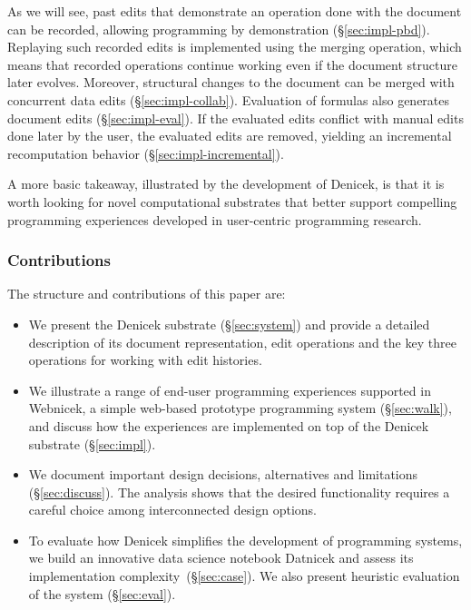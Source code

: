\documentclass[sigconf]{acmart}
\newcommand{\diff}[1]{{#1}}
\newcommand{\note}[1]{}
\begin{document}
As we will see, past edits that demonstrate an operation done with the
document can be recorded, allowing programming by demonstration (\S\ref{sec:impl-pbd}).  Replaying
such recorded edits is implemented using the merging operation, which means that recorded operations
continue working even if the document structure later evolves. Moreover, structural changes to the
document can be merged with concurrent data edits  (\S\ref{sec:impl-collab}). Evaluation of formulas
also generates document edits (\S\ref{sec:impl-eval}). If the evaluated edits conflict with manual
edits done later by the user, the evaluated edits are removed, yielding an incremental
recomputation behavior (\S\ref{sec:impl-incremental}).

\note{Add a more general takeaway suggested by Reviewer 3 (Thank you!)}
\diff{A more basic takeaway, illustrated by the development of Denicek, is that it is worth looking
for novel computational substrates that better support compelling programming experiences developed
in user-centric programming research.}

\subsubsection*{Contributions}
The structure and contributions of this paper are:

\begin{itemize}
\item We present the Denicek substrate (\S\ref{sec:system}) and provide a detailed description of its
  document representation, edit operations and the key three operations for working with edit histories.
\item We illustrate a range of end-user programming experiences supported in Webnicek, a simple
  web-based prototype programming system (\S\ref{sec:walk}), and discuss how the experiences are
  implemented on top of the Denicek substrate (\S\ref{sec:impl}).
\item We document important design decisions, alternatives and limitations (\S\ref{sec:discuss}).
  The analysis shows that the desired functionality requires a careful choice among interconnected
  design options.
\item To evaluate how Denicek simplifies the development of program\-ming systems, we
  build an innovative data science notebook Datnicek and assess its implementation
  complexity~(\S\ref{sec:case}). We also present heuristic evaluation of the system (\S\ref{sec:eval}).
\end{itemize}
\end{document}

